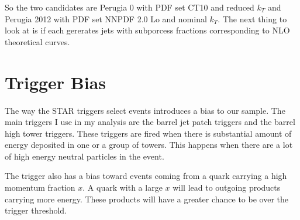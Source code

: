 \documentclass[abstract = on,listof=totoc, bibliography=totoc]{scrreprt}
\begin{document}
So the two candidates are Perugia 0 with PDF set CT10 and reduced $k_T$ and Perugia 2012 with PDF set NNPDF 2.0 Lo and nominal $k_T$.  The next thing to look at is if each gererates jets with subporcess fractions corresponding to NLO theoretical curves. 

\begin{figure}
\caption{}
\label{fig:jetSubprocessFractions}
\end{figure}



\chapter{Trigger Bias}

The way the STAR triggers select events introduces a bias to our sample. The main triggers I use in my analysis are the barrel jet patch triggers and the barrel high tower triggers. These triggers are fired when there is substantial amount of energy deposited in one or a group of towers. This happens when there are a lot of high energy neutral particles in the event. 



The trigger also has a bias toward events coming from a quark carrying a high momentum fraction $x$. A quark with a large $x$ will lead to outgoing products carrying more energy. These products will have a greater chance to be over the trigger threshold.   
\end{document}

